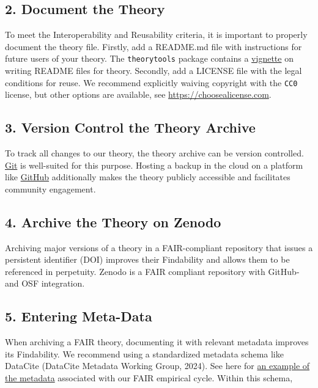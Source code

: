 \documentclass[man]{apa7}
\begin{document}
\subsection{2. Document the Theory}\label{document-the-theory}

To meet the Interoperability and Reusability criteria,
it is important to properly document the theory file.
Firstly, add a README.md file with instructions for future users of your theory.
The \texttt{theorytools} package contains a \href{https://cjvanlissa.github.io/theorytools/articles/readme.html}{vignette} on writing README files for theory.
Secondly, add a LICENSE file with the legal conditions for reuse.
We recommend explicitly waiving copyright with the \texttt{CC0} license, but other options are available, see \href{https://choosealicense.com/non-software/}{https://choosealicense.com}.

\subsection{3. Version Control the Theory Archive}\label{version-control-the-theory-archive}

To track all changes to our theory, the theory archive can be version controlled.
\href{https://git-scm.com/book/en/v2/Getting-Started-Installing-Git}{Git} is well-suited for this purpose.
Hosting a backup in the cloud on a platform like \href{https://github.blog/developer-skills/github/beginners-guide-to-github-repositories-how-to-create-your-first-repo/}{GitHub} additionally makes the theory publicly accessible and facilitates community engagement.

\subsection{4. Archive the Theory on Zenodo}\label{archive-the-theory-on-zenodo}

Archiving major versions of a theory in a FAIR-compliant repository that issues a persistent identifier (DOI) improves their Findability and allows them to be referenced in perpetuity.
Zenodo is a FAIR compliant repository with GitHub- and OSF integration.

\subsection{5. Entering Meta-Data}\label{entering-meta-data}

When archiving a FAIR theory, documenting it with relevant metadata improves its Findability.
We recommend using a standardized metadata schema like DataCite (DataCite Metadata Working Group, 2024).
See here for \href{https://github.com/cjvanlissa/fair_theory/blob/3b4894da576cb76d19e911a05dd513d5172058ec/example_metadata.json}{an example of the metadata} associated with our FAIR empirical cycle.
Within this schema,
\end{document}
